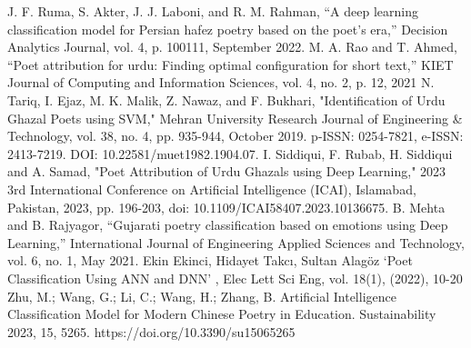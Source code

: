 \documentclass[conference]{IEEEtran}
\begin{document}
\begin{thebibliography}{00}
 J. F. Ruma, S. Akter, J. J. Laboni, and R. M. Rahman, “A deep learning
classification model for Persian hafez poetry based on the poet’s era,”
Decision Analytics Journal, vol. 4, p. 100111, September 2022.
 M. A. Rao and T. Ahmed, “Poet attribution for urdu: Finding optimal configuration for short text,” KIET Journal of Computing and Information Sciences, vol. 4, no. 2, p. 12, 2021
 N. Tariq, I. Ejaz, M. K. Malik, Z. Nawaz, and F. Bukhari, "Identification of Urdu Ghazal Poets using SVM," Mehran University Research Journal of Engineering \& Technology, vol. 38, no. 4, pp. 935-944, October 2019. p-ISSN: 0254-7821, e-ISSN: 2413-7219. DOI: 10.22581/muet1982.1904.07.
 I. Siddiqui, F. Rubab, H. Siddiqui and A. Samad, "Poet Attribution of Urdu Ghazals using Deep Learning," 2023 3rd International Conference on Artificial Intelligence (ICAI), Islamabad, Pakistan, 2023, pp. 196-203, doi: 10.1109/ICAI58407.2023.10136675.
 B. Mehta and B. Rajyagor, “Gujarati poetry classification based on
emotions using Deep Learning,” International Journal of Engineering
Applied Sciences and Technology, vol. 6, no. 1, May 2021.
 Ekin Ekinci, Hidayet Takcı, Sultan Alagöz ‘Poet Classification Using ANN and DNN’ , Elec Lett Sci Eng, vol.
18(1), (2022), 10-20
 Zhu, M.; Wang, G.; Li, C.; Wang, H.; Zhang, B. Artificial Intelligence Classification Model for Modern Chinese Poetry in Education. Sustainability 2023, 15, 5265. https://doi.org/10.3390/su15065265

\end{thebibliography}
\vspace{12pt}
\color{red}
\end{document}
